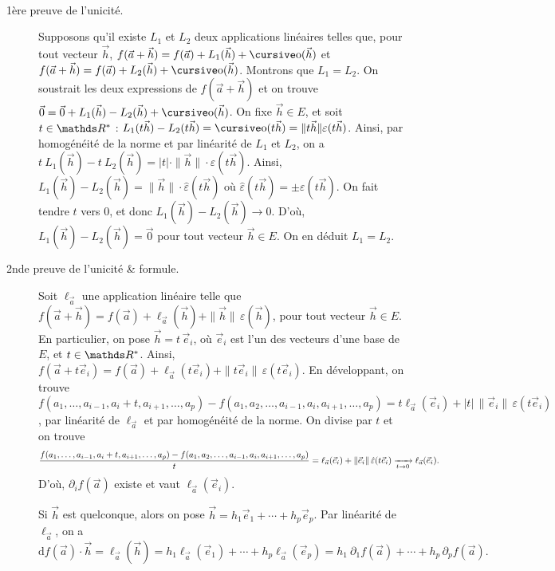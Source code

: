 \begin{prv}~\\
	\begin{description}
		\item[1ère preuve de l'unicité.] Supposons qu'il existe $L_1$ et $L_2$ deux applications linéaires telles que, pour tout vecteur $\vec{h}$, $f(\vec{a}+\vec{h}) = f(\vec{a}) + L_1(\vec{h}) + \po(\vec{h})$ et $f(\vec{a}+\vec{h}) = f(\vec{a}) + L_2(\vec{h}) + \po(\vec{h})$.
			Montrons que $L_1 = L_2$. On soustrait les deux expressions de $f(\vec{a} + \vec{h})$ et on trouve $\vec{0} = \vec{0} + L_1(\vec{h}) - L_2(\vec{h}) + \po(\vec{h})$.
			On fixe $\vec{h} \in E$, et soit $t \in \R^*$ : $L_1(t\vec{h}) - L_2(t \vec{h}) = \po(t\vec{h}) = \|t \vec{h}\| \varepsilon(t \vec{h})$. Ainsi, par homogénéité de la norme et par linéarité de $L_1$ et $L_2$, on a $t\:L_1(\vec{h}) - t\:L_2(\vec{h}) = |t|\cdot \|\vec{h}\|\cdot \varepsilon(t\vec{h})$.
			Ainsi, $L_1(\vec{h}) - L_2(\vec{h}) = \|\vec{h}\|\cdot \hat{\varepsilon}(t \vec{h})$ où $\hat{\varepsilon}(t \vec{h}) = \pm \varepsilon(t \vec{h})$.
			On fait tendre $t$ vers 0, et donc $L_1(\vec{h}) - L_2(\vec{h}) \to 0$. D'où, $L_1(\vec{h}) - L_2(\vec{h}) = \vec{0}$ pour tout vecteur $\vec{h} \in E$. On en déduit $L_1 = L_2$.
		\item[2nde preuve de l'unicité \& formule.]
			Soit $\ell_{\vec{a}}$ une application linéaire telle que $f(\vec{a}+\vec{h}) = f(\vec{a}) + \ell_{\vec{a}}(\vec{h}) + \|\vec{h}\|\,\varepsilon(\vec{h})$, pour tout vecteur $\vec{h} \in E$.
			En particulier, on pose $\vec{h} = t\,\vec{e}_i$, où $\vec{e}_i$ est l'un des vecteurs d'une base de $E$, et $t \in \R^*$.
			Ainsi, $f(\vec{a}+t \vec{e}_i) = f(\vec{a}) + \ell_{\vec{a}}(t \vec{e}_i) + \|t \vec{e}_i\|\, \varepsilon(t \vec{e}_i)$.
			En développant, on trouve $f(a_1, \ldots, a_{i-1}, a_i + t, a_{i+1}, \ldots, a_p) - f(a_1, a_2, \ldots, a_{i-1},a_i,a_{i+1},\ldots,a_p) = t \ell_{\vec{a}}(\vec{e}_i) + |t|\, \|\vec{e}_i\|\,\varepsilon(t \vec{e}_i)$, par linéarité de $\ell_{\vec{a}}$ et par homogénéité de la norme.
			On divise par $t$ et on trouve \[
				\frac{f(a_1, \ldots, a_{i-1}, a_i + t, a_{i+1}, \ldots, a_p) - f(a_1, a_2, \ldots, a_{i-1},a_i,a_{i+1},\ldots,a_p)}{t} = \ell_{\vec{a}}(\vec{e}_i) + \|\vec{e}_i\|\, \hat{\varepsilon}(t \vec{e}_i) \xrightarrow[t \to 0]{} \ell_{\vec{a}}(\vec{e}_i)
			.\] D'où, $\partial_i f(\vec{a})$ existe et vaut $\ell_{\vec{a}}(\vec{e}_i)$.
			
			Si $\vec{h}$ est quelconque, alors on pose $\vec{h} = h_1 \vec{e}_1 + \cdots + h_p \vec{e}_p$. Par linéarité de $\ell_{\vec{a}}$, on a \[
				\mathrm{d}f(\vec{a}) \cdot \vec{h} = \ell_{\vec{a}}(\vec{h}) = h_1 \ell_{\vec{a}}(\vec{e}_1) + \cdots + h_p \ell_{\vec{a}}(\vec{e}_p) = h_1\:\partial_1f(\vec{a}) + \cdots + h_p\,\partial_p f(\vec{a})
			.\]
	\end{description}
\end{prv}

